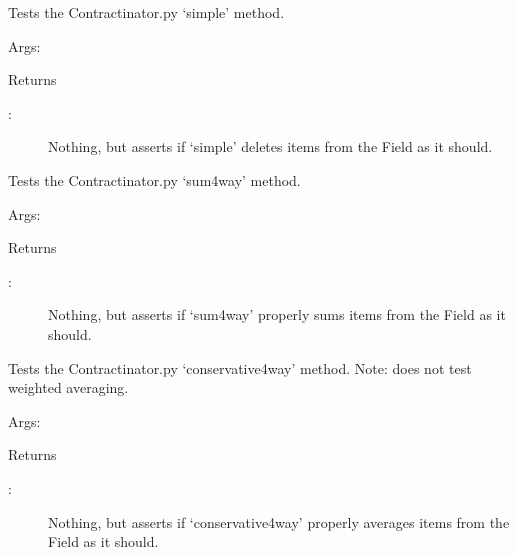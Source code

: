 \documentclass[letterpaper,10pt,english]{sphinxmanual}
\begin{document}
\begin{fulllineitems}
\label{\detokenize{autoapi/tests/test_Contractinator/index:tests.test_Contractinator.test_simple}}
\sphinxAtStartPar
Tests the Contractinator.py ‘simple’ method.

\sphinxAtStartPar
Args:

\sphinxAtStartPar
Returns
\begin{description}
\item[{:}] \leavevmode
\sphinxAtStartPar
Nothing, but asserts if ‘simple’ deletes items from the Field as it should.

\end{description}

\end{fulllineitems}


\begin{fulllineitems}
\label{\detokenize{autoapi/tests/test_Contractinator/index:tests.test_Contractinator.test_sum4way}}
\sphinxAtStartPar
Tests the Contractinator.py ‘sum4way’ method.

\sphinxAtStartPar
Args:

\sphinxAtStartPar
Returns
\begin{description}
\item[{:}] \leavevmode
\sphinxAtStartPar
Nothing, but asserts if ‘sum4way’ properly sums items from the Field as it should.

\end{description}

\end{fulllineitems}


\begin{fulllineitems}
\label{\detokenize{autoapi/tests/test_Contractinator/index:tests.test_Contractinator.test_conservative4way}}
\sphinxAtStartPar
Tests the Contractinator.py ‘conservative4way’ method. Note: does not test weighted averaging.

\sphinxAtStartPar
Args:

\sphinxAtStartPar
Returns
\begin{description}
\item[{:}] \leavevmode
\sphinxAtStartPar
Nothing, but asserts if ‘conservative4way’ properly averages items from the Field as it should.

\end{description}

\end{fulllineitems}
\end{document}
